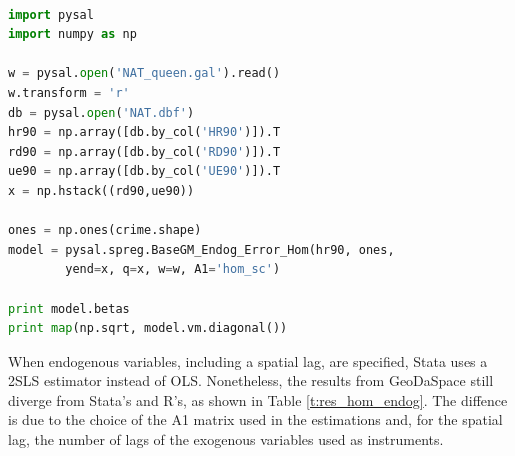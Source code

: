 \documentclass{article}
\begin{document}
\begin{code}
\begin{lstlisting}[label=lt:hom_stata,caption=Using PySAL to match the results of spatial error models from Stata,language=Python]

import pysal
import numpy as np

w = pysal.open('NAT_queen.gal').read()
w.transform = 'r'
db = pysal.open('NAT.dbf')
hr90 = np.array([db.by_col('HR90')]).T
rd90 = np.array([db.by_col('RD90')]).T
ue90 = np.array([db.by_col('UE90')]).T
x = np.hstack((rd90,ue90))

ones = np.ones(crime.shape)
model = pysal.spreg.BaseGM_Endog_Error_Hom(hr90, ones,
        yend=x, q=x, w=w, A1='hom_sc')

print model.betas
print map(np.sqrt, model.vm.diagonal())

\end{lstlisting}
\end{code}

When endogenous variables, including a spatial lag, are specified, Stata uses a 2SLS estimator instead of OLS. Nonetheless, the results from GeoDaSpace still diverge from Stata's and R's, as shown in Table \ref{t:res_hom_endog}. The diffence is due to the choice of the A1 matrix used in the estimations and, for the spatial lag, the number of lags of the exogenous variables used as instruments.  
\end{document}
